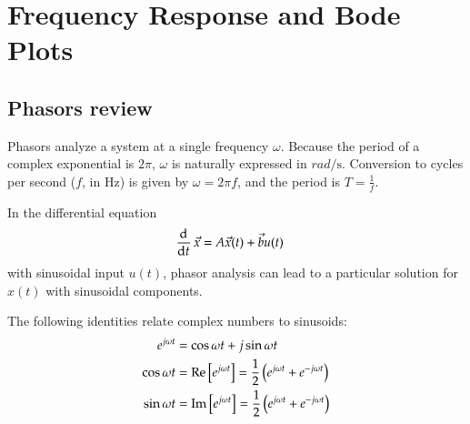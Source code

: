 \chapter{Frequency Response and Bode Plots}

\section{Phasors review}
Phasors analyze a system at a single frequency \(\omega\).
Because the period of a complex exponential is \(2\pi\), \(\omega\) is naturally expressed in \(\unit{rad}/\text{s}\).
Conversion to cycles per second (\(f\), in Hz) is given by \(\omega = 2\pi f\), and the period is \(T = \frac{1}{f}\).


In the differential equation
\begin{align}
  \dod{}{t} \vec x &= A \vec x(t) + \vec b u(t)
\end{align}
with sinusoidal input \(u(t)\), phasor analysis can lead to a particular solution for \(x(t)\) with sinusoidal components.

The following identities relate complex numbers to sinusoids:
\begin{align}
  e^{j\omega t} &= \cos \omega t + j \sin \omega t\\
  \cos \omega t &= \Re\sbr{e^{j\omega t}}  = \frac{1}{2} \del{e^{j\omega t} + e^{-j\omega t}} \\
  \sin \omega t &= \Im\sbr{e^{j\omega t}}  = \frac{1}{2} \del{e^{j\omega t} + e^{-j\omega t}}
\end{align}

